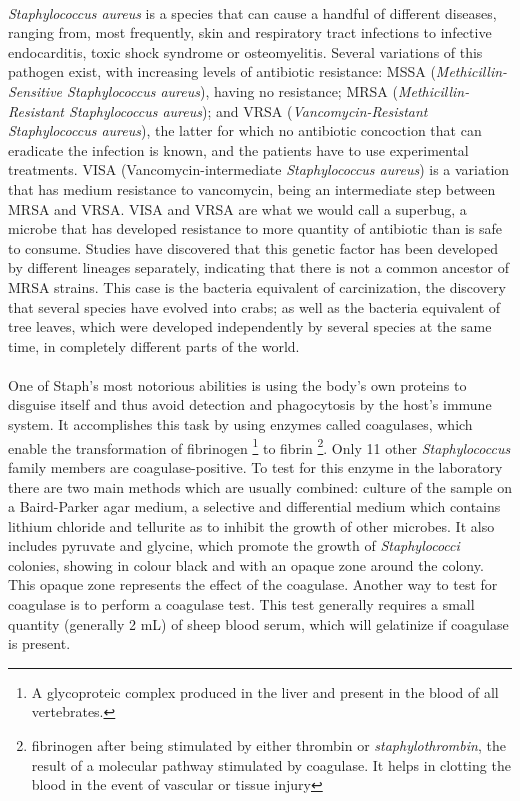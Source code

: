 \paragraph{}\emph{Staphylococcus aureus} is a species that can cause a handful of different diseases, ranging from, most frequently, skin and respiratory tract infections to infective endocarditis, toxic shock syndrome or osteomyelitis. Several variations of this pathogen exist, with increasing levels of antibiotic resistance: MSSA (\emph{Methicillin-Sensitive Staphylococcus aureus}), having no resistance; MRSA (\emph{Methicillin-Resistant Staphylococcus aureus}); and VRSA (\emph{Vancomycin-Resistant \emph{Staphylococcus aureus}}), the   latter for which no antibiotic concoction that can eradicate the infection is known, and the patients have to use experimental treatments. VISA (Vancomycin-intermediate \emph{Staphylococcus aureus}) is a variation that has medium resistance to vancomycin, being an intermediate step between MRSA and VRSA. VISA and VRSA are what we would call a superbug, a microbe that has developed resistance to more quantity of antibiotic than is safe to consume. Studies have discovered that this genetic factor has been developed by different lineages separately, indicating that there is not a common ancestor of MRSA strains. This case is the bacteria equivalent of carcinization, the discovery that several species have evolved into crabs; as well as the bacteria equivalent of tree leaves, which were developed independently by several species at the same time, in completely different parts of the world.
\paragraph{}One of Staph's most notorious abilities is using the body's own proteins to disguise itself and thus avoid detection and phagocytosis by the host's immune system. It accomplishes this task by using enzymes called coagulases, which enable the transformation of fibrinogen \footnote{A glycoproteic complex produced in the liver and present in the blood of all vertebrates.} to fibrin \footnote{fibrinogen after being stimulated by either thrombin or \emph{staphylothrombin}, the result of a molecular pathway stimulated by coagulase. It helps in clotting the blood in the event of vascular or tissue injury}\cite{murrayMicrobiologiaMedica2013}. Only 11 other \emph{Staphylococcus} family members are coagulase-positive. To test for this enzyme in the laboratory there are two main methods which are usually combined: culture of the sample on a Baird-Parker agar medium, a selective and differential medium which contains lithium chloride and tellurite as to inhibit the growth of other microbes. It also includes pyruvate and glycine, which promote the growth of \emph{Staphylococci} colonies, showing in colour black and with an opaque zone around the colony. This opaque zone represents the effect of the coagulase. Another way to test for coagulase is to perform a coagulase test. This test generally requires a small quantity (generally 2 mL) of sheep blood serum, which will gelatinize if coagulase is present.
